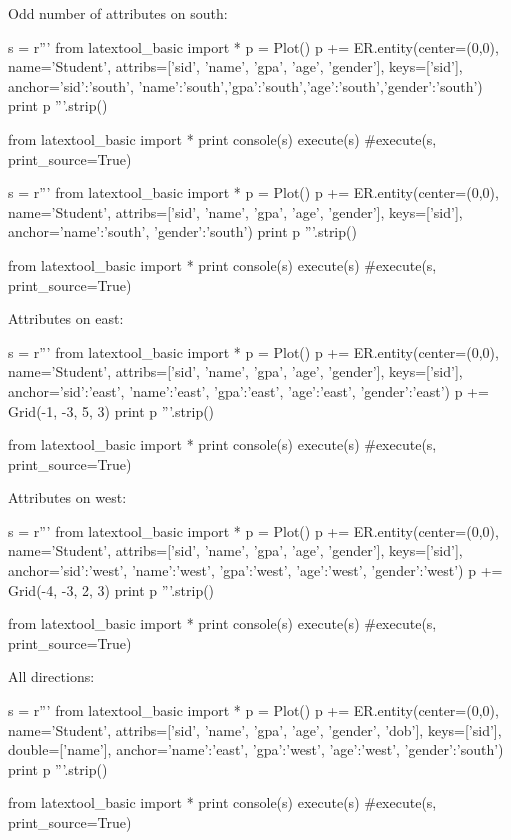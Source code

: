 Odd number of attributes on south:
\begin{python}
s = r'''
from latextool_basic import *
p = Plot()
p += ER.entity(center=(0,0),
          name='Student',
          attribs=['sid', 'name', 'gpa', 'age', 'gender'],
          keys=['sid'],
          anchor={'sid':'south', 'name':'south','gpa':'south','age':'south','gender':'south'})
print p
'''.strip()

from latextool_basic import *
print console(s)
execute(s)
#execute(s, print_source=True)
\end{python}




\begin{python}
s = r'''
from latextool_basic import *
p = Plot()
p += ER.entity(center=(0,0),
          name='Student',
          attribs=['sid', 'name', 'gpa', 'age', 'gender'],
          keys=['sid'],
          anchor={'name':'south', 'gender':'south'})
print p
'''.strip()

from latextool_basic import *
print console(s)
execute(s)
#execute(s, print_source=True)
\end{python}


\newpage
Attributes on east:
\begin{python}
s = r'''
from latextool_basic import *
p = Plot()
p += ER.entity(center=(0,0),
          name='Student',
          attribs=['sid', 'name', 'gpa', 'age', 'gender'],
          keys=['sid'],
          anchor={'sid':'east', 'name':'east', 'gpa':'east',
                  'age':'east',
                  'gender':'east'})
p += Grid(-1, -3, 5, 3)
print p
'''.strip()

from latextool_basic import *
print console(s)
execute(s)
#execute(s, print_source=True)
\end{python}



\newpage
Attributes on west:
\begin{python}
s = r'''
from latextool_basic import *
p = Plot()
p += ER.entity(center=(0,0),
          name='Student',
          attribs=['sid', 'name', 'gpa', 'age', 'gender'],
          keys=['sid'],
          anchor={'sid':'west', 'name':'west', 'gpa':'west',
                  'age':'west', 'gender':'west'})
p += Grid(-4, -3, 2, 3)
print p
'''.strip()

from latextool_basic import *
print console(s)
execute(s)
#execute(s, print_source=True)
\end{python}


\newpage
All directions:
\begin{python}
s = r'''
from latextool_basic import *
p = Plot()
p += ER.entity(center=(0,0),
          name='Student',
          attribs=['sid', 'name', 'gpa', 'age', 'gender', 'dob'],
          keys=['sid'],
          double=['name'],
          anchor={'name':'east', 'gpa':'west',
                  'age':'west', 'gender':'south'})
print p
'''.strip()

from latextool_basic import *
print console(s)
execute(s)
#execute(s, print_source=True)
\end{python}

